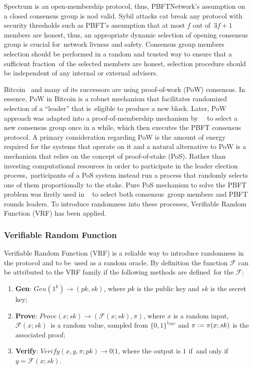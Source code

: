 Spectrum is an open-membership protocol, thus, PBFTNetwork's assumption on a closed consensus group is nod valid.
Sybil attacks cat break any protocol with security thresholds such as PBFT's assumption that at most $f$ out of\
${3 f + 1}$ members are honest, thus, an appropriate dynamic selection of opening consensus group is crucial for\
network livness and safety.
Consensus group members selection should be performed in a random and trusted way to ensure that a sufficient fraction\
of the selected members are honest, selection procedure should be independent of any internal or external advisers.

Bitcoin~\cite{nakamoto2009bitcoin} and many of its successors are using proof-of-work (PoW) consensus.
In essence, PoW in Bitcoin is a robust mechanism that facilitates randomized selection of a \enquote{leader} that is\
eligible to produce a new block.
Later, PoW approach was adapted into a proof-of-membership mechanism by ~\cite{kokoriskogias2016enhancing}\
to select a new consensus group once in a while, which then executes the PBFT consensus protocol.
A primary consideration regarding PoW is the amount of energy required for the systems that operate on it and
a natural alternative to PoW is a mechanism that relies on the concept of proof-of-stake (PoS).
Rather than investing computational resources in order to participate in the leader election process,\
participants of a PoS system instead run a process that randomly selects one of them proportionally to the stake.
Pure PoS mechanism to solve the PBFT problem was firstly used in ~\cite{cryptoeprint:2017/454} to select both consensus\
group members and PBFT rounds leaders.
To introduce randomness into these processes, Verifiable Random Function (VRF) has been applied.

\subsubsection{Verifiable Random Function}

Verifiable Random Function (VRF) is a reliable way to introduce randomness in the protocol and to be\
used as a random oracle.
By definition the function $\mathcal{F}$ can be attributed to the VRF family if the following methods are defined\
for the $\mathcal{F}$:
\begin{enumerate}
    \item \textbf{Gen}: ${Gen(1^k) \rightarrow (pk, sk)}$, where $pk$ is the public key and $sk$ is the secret key;
    \item \textbf{Prove}: ${Prove(x; sk) \rightarrow (\mathcal{F}(x; sk), \pi)}$, where $x$ is a random input, $\mathcal{F}(x; sk)$\
    is a random value, sampled from $\{0,1\}^{l_{VRF}}$ and $\pi \vcentcolon= \pi(x; sk)$ is the associated proof;
    \item \textbf{Verify}: ${Verify(x, y, \pi; pk) \rightarrow 0 | 1}$, where the output is $1$ if\
    and only if ${y=\mathcal{F}(x; sk)}$.
\end{enumerate}


